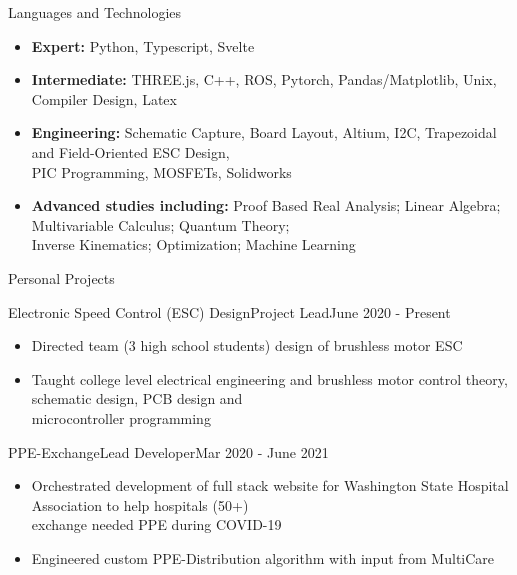 \documentclass[]{mcdowellcv}
\begin{document}
\begin{cvsection}{Languages and Technologies}
		\begin{cvsubsection}{}{}{}	
			\begin{itemize}
				\item \textbf{Expert:} Python, Typescript, Svelte
				\item \textbf{Intermediate:} THREE.js, C++, ROS, Pytorch, Pandas/Matplotlib, Unix, Compiler Design, Latex
                    \item \textbf{Engineering:} Schematic Capture, Board Layout, Altium, I2C,
Trapezoidal and Field-Oriented ESC Design, \\ PIC Programming, MOSFETs, Solidworks
                    \item \textbf{Advanced studies including:} Proof Based Real Analysis; Linear Algebra; Multivariable Calculus; Quantum Theory; \\ Inverse Kinematics; Optimization; Machine Learning
			\end{itemize}
		\end{cvsubsection}
	\end{cvsection}
	
	\begin{cvsection}{Personal Projects}
		\begin{cvsubsection}{Electronic Speed Control (ESC) Design}{Project Lead}{June 2020 - Present}
			\begin{itemize}
				\item Directed team (3 high school students) design of brushless motor ESC
                    \item Taught college level electrical engineering and brushless motor control theory,   schematic design, PCB design and \\ microcontroller programming
			\end{itemize}
		\end{cvsubsection}
		\begin{cvsubsection}{PPE-Exchange}{Lead Developer}{Mar 2020 - June 2021}
			\begin{itemize}
				\item Orchestrated development of full stack website for Washington State Hospital Association to help hospitals (50+) \\ exchange needed PPE during COVID-19
                    \item Engineered custom PPE-Distribution algorithm with input from MultiCare
			\end{itemize}
		\end{cvsubsection}
	\end{cvsection}
	
\end{document}
